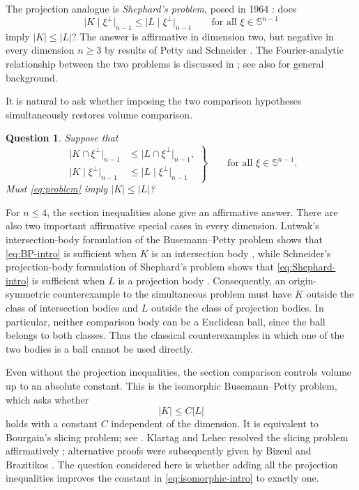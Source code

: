 \documentclass[11pt]{article}
\newtheorem*{question}{Question}
\theoremstyle{remark}
\newcommand{\Sph}{\mathbb{S}}
\begin{document}
The projection analogue is \emph{Shephard's problem}, posed in 1964
\cite{Shephard}: does
\begin{equation}\label{eq:Shephard-intro}
 \bigl|K\mid\xi^\perp\bigr|_{n-1}
 \leq \bigl|L\mid\xi^\perp\bigr|_{n-1}
 \qquad\text{for all }\xi\in\Sph^{n-1}
\end{equation}
imply $|K|\leq|L|$?  The answer is affirmative in dimension two, but
negative in every dimension $n\geq3$ by results of Petty and Schneider
\cite{Petty,Schneider1967}.  The Fourier-analytic relationship
between the two problems is discussed in
\cite{KoldobskyRyaboginZvavitch,KoldobskyBook,KoldobskyYaskinBook};
see also \cite{SchneiderBook,GardnerBook} for general background.

It is natural to ask whether imposing the two comparison hypotheses
simultaneously restores volume comparison.

\begin{question}
Suppose that
\begin{equation}\label{eq:problem}
 \left.
 \begin{aligned}
  \bigl|K\cap\xi^\perp\bigr|_{n-1}
   &\leq \bigl|L\cap\xi^\perp\bigr|_{n-1},\\
  \bigl|K\mid\xi^\perp\bigr|_{n-1}
   &\leq \bigl|L\mid\xi^\perp\bigr|_{n-1}
 \end{aligned}
 \right\}
 \qquad\text{for all }\xi\in\Sph^{n-1}.
\end{equation}
Must \eqref{eq:problem} imply $|K|\leq|L|$?
\end{question}

For $n\leq4$, the section inequalities alone give an affirmative answer.
There are also two important affirmative special cases in every dimension.
Lutwak's intersection-body formulation of the Busemann--Petty problem
shows that \eqref{eq:BP-intro} is sufficient when $K$ is an intersection
body \cite{Lutwak,Gardner1994}, while Schneider's projection-body
formulation of Shephard's problem shows that \eqref{eq:Shephard-intro} is
sufficient when $L$ is a projection body \cite{Schneider1967,Petty}.
 Consequently, an origin-symmetric
counterexample to the simultaneous problem must have $K$ outside the class
of intersection bodies and $L$ outside the class of projection bodies.  In
particular, neither comparison body can be a Euclidean ball, since the ball
belongs to both classes.  Thus the classical counterexamples in which one
of the two bodies is a ball cannot be used directly.

Even without the projection inequalities, the section comparison controls
volume up to an absolute constant.  This is the isomorphic
Busemann--Petty problem, which asks whether
\begin{equation}\label{eq:isomorphic-intro}
 |K|\leq C|L|
\end{equation}
holds with a constant $C$ independent of the dimension.  It is equivalent
to Bourgain's slicing problem; see \cite{MP89}.  Klartag and Lehec resolved
the slicing problem affirmatively \cite{KlartagLehec}; alternative proofs
were subsequently given by Bizeul \cite{Bizeul} and Brazitikos
\cite{BrazitikosSlicing}.  The question considered here is whether adding
all the projection inequalities improves the constant in
\eqref{eq:isomorphic-intro} to exactly one.
\end{document}
